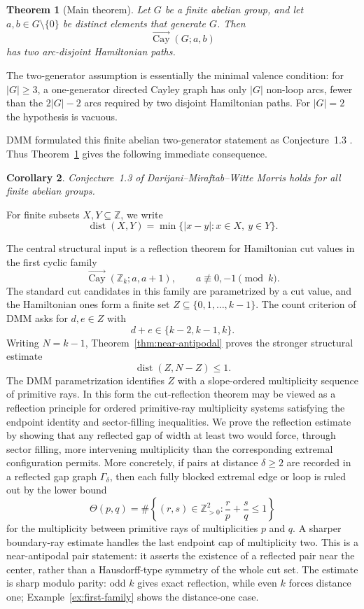 \documentclass[11pt]{article}
\newtheorem{theorem}{Theorem}[section]
\newtheorem{corollary}[theorem]{Corollary}
\newcommand{\Cay}{\overrightarrow{\operatorname{Cay}}}
\newcommand{\Z}{\mathbb Z}
\newcommand{\dist}{\operatorname{dist}}
\begin{document}
\begin{theorem}[Main theorem]\label{thm:main}
Let $G$ be a finite abelian group, and let $a,b\in G\setminus\{0\}$ be distinct elements that generate $G$.  Then
\[
        \Cay(G;a,b)
\]
has two arc-disjoint Hamiltonian paths.
\end{theorem}

The two-generator assumption is essentially the minimal valence condition: for $|G|\ge3$, a one-generator directed Cayley graph has only $|G|$ non-loop arcs, fewer than the $2|G|-2$ arcs required by two disjoint Hamiltonian paths.  For $|G|=2$ the hypothesis is vacuous.

DMM formulated this finite abelian two-generator statement as Conjecture~1.3 \cite[Conjecture~1.3]{DMM}.  Thus Theorem~\ref{thm:main} gives the following immediate consequence.

\begin{corollary}\label{cor:dmm-conj-abelian}
Conjecture~1.3 of Darijani--Miraftab--Witte Morris holds for all finite abelian groups.
\end{corollary}


For finite subsets $X,Y\subseteq\Z$, we write
\[
        \dist(X,Y)=\min\{|x-y|:x\in X,\ y\in Y\}.
\]

The central structural input is a reflection theorem for Hamiltonian cut values in the first cyclic family
\[
        \Cay(\Z_k;a,a+1),
        \qquad a\not\equiv0,-1\pmod{k}.
\]
The standard cut candidates in this family are parametrized by a cut value, and the Hamiltonian ones form a finite set $Z\subseteq\{0,1,\ldots,k-1\}$.  The count criterion of DMM asks for $d,e\in Z$ with
\[
        d+e\in\{k-2,k-1,k\}.
\]
Writing $N=k-1$, Theorem~\ref{thm:near-antipodal} proves the stronger structural estimate
\[
        \dist(Z,N-Z)\le1.
\]
The DMM parametrization identifies $Z$ with a slope-ordered multiplicity sequence of primitive rays.  In this form the cut-reflection theorem may be viewed as a reflection principle for ordered primitive-ray multiplicity systems satisfying the endpoint identity and sector-filling inequalities.  We prove the reflection estimate by showing that any reflected gap of width at least two would force, through sector filling, more intervening multiplicity than the corresponding extremal configuration permits.  More concretely, if pairs at distance $\delta\ge2$ are recorded in a reflected gap graph $\Gamma_\delta$, then each fully blocked extremal edge or loop is ruled out by the lower bound
\[
        \Theta(p,q)=\#\left\{(r,s)\in\Z_{>0}^2:\frac rp+\frac sq\le1\right\}
\]
for the multiplicity between primitive rays of multiplicities $p$ and $q$.  A sharper boundary-ray estimate handles the last endpoint cap of multiplicity two.  This is a near-antipodal pair statement: it asserts the existence of a reflected pair near the center, rather than a Hausdorff-type symmetry of the whole cut set.  The estimate is sharp modulo parity: odd $k$ gives exact reflection, while even $k$ forces distance one; Example~\ref{ex:first-family} shows the distance-one case.
\end{document}
